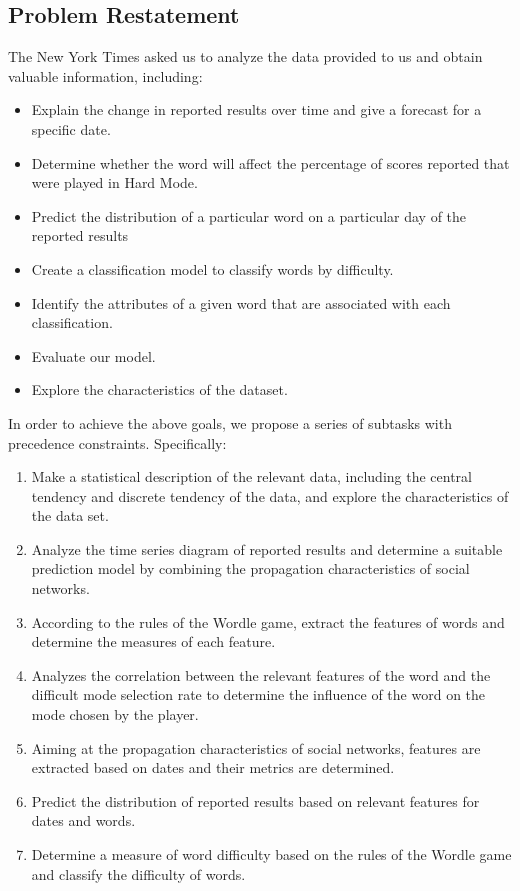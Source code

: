 \documentclass[12pt]{article}  %
\begin{document}
\subsection{Problem Restatement}
The New York Times asked us to analyze the data provided to us and obtain valuable information, including:
\begin{itemize}
    \item Explain the change in reported results over time and give a forecast for a specific date.
    \item Determine whether the word will affect the percentage of scores reported that were played in Hard Mode.
    \item Predict the distribution of a particular word on a particular day of the reported results
    \item Create a classification model to classify words by difficulty.
    \item Identify the attributes of a given word that are associated with each classification.
    \item Evaluate our model.
    \item Explore the characteristics of the dataset.
\end{itemize}

In order to achieve the above goals, we propose a series of subtasks with precedence constraints. Specifically:
\begin{enumerate}
    \item Make a statistical description of the relevant data, including the central tendency and discrete tendency of the data, and explore the characteristics of the data set.
    \item Analyze the time series diagram of reported results and determine a suitable prediction model by combining the propagation characteristics of social networks.
    \item According to the rules of the Wordle game, extract the features of words and determine the measures of each feature.
    \item Analyzes the correlation between the relevant features of the word and the difficult mode selection rate to determine the influence of the word on the mode chosen by the player.
    \item Aiming at the propagation characteristics of social networks, features are extracted based on dates and their metrics are determined.
    \item Predict the distribution of reported results based on relevant features for dates and words.
    \item Determine a measure of word difficulty based on the rules of the Wordle game and classify the difficulty of words.
\end{enumerate}
\end{document}

